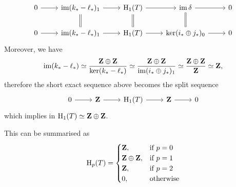 \begin{example}[Torus]
\begin{enumerate}[(a)]
\begin{itemize}
\[\begin{tikzcd}
                                0 \ar[r]
                                &\im(k_{*} - \ell_{*})_1 \ar[r] \ar[d, equals]
                                &\Hmlg_1(T) \ar[r] \ar[d, equals]
                                &\im \delta \ar[d, equals] \ar[r]
                                &0
                                \\
                                0 \ar[r]
                                &\im(k_{*} - \ell_{*})_1 \ar[r]
                                &\Hmlg_1(T) \ar[r]
                                &\ker(i_{*} \oplus j_{*})_0
                                \ar[r]
                                &0
                            \end{tikzcd}
                        \]
                        Moreover, we have
                        \[
                            \operatorname{im} (k_{*} - \ell_{*}) \simeq \frac{\mathbf{Z} \oplus \mathbf{Z}}{\ker (k_{*} - \ell_{*})}
                            \simeq \frac{\mathbf{Z} \oplus \mathbf{Z}}{\operatorname{im}(i_{*} \oplus j_{*})_1}
                            \simeq \frac{\mathbf{Z} \oplus \mathbf{Z}}{\mathbf{Z}}
                            \simeq \mathbf{Z},
                        \]
                        therefore the short exact sequence above becomes the split sequence
                        \[
                            \begin{tikzcd}
                                0 \ar[r] &\Z \ar[r] &\Hmlg_1(T) \ar[r] &\Z \ar[r] &0
                            \end{tikzcd}
                        \]
                        which implies in \(\operatorname{H}_1(T) \simeq \mathbf{Z} \oplus \mathbf{Z}\).
              \end{itemize}
              This can be summarised as
              \[
                  \operatorname{H}_p(T) =
                  \begin{cases}
                      \mathbf{Z},           & \text{if } p = 0 \\
                      \mathbf{Z} \oplus \mathbf{Z}, & \text{if } p = 1 \\
                      \mathbf{Z},           & \text{if } p = 2 \\
                      0,            & \text{otherwise}
                  \end{cases}
              \]


\end{enumerate}
\end{example}

